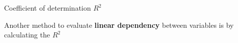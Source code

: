 \documentclass[11pt,compress,t,notes=noshow, aspectratio=169, xcolor=table]{beamer}
\begin{document}
\begin{frame}{Coefficient of determination $R^2$}

Another method to evaluate \textbf{linear dependency} between variables is by calculating the $R^2$

\begin{columns}[c, totalwidth=\textwidth]
\begin{column}{0.5\linewidth}

\end{column}
\end{columns}
\end{frame}
\end{document}
